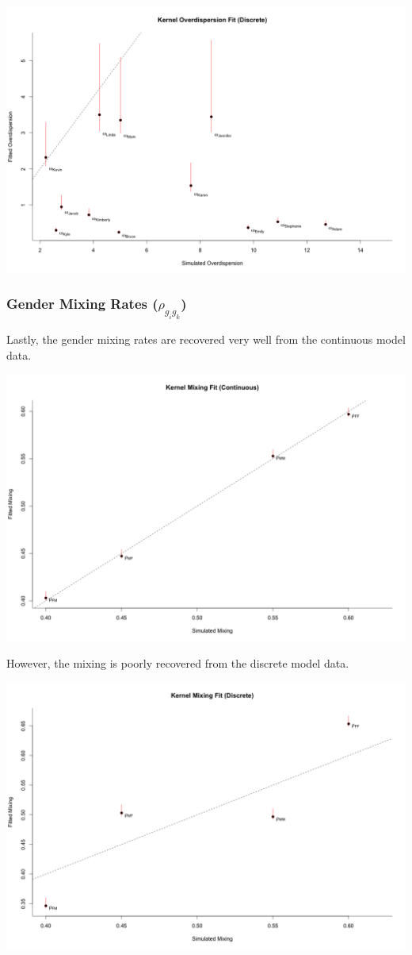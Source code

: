 \documentclass[12pt]{article}
\begin{document}
\includegraphics[scale = 0.38]{Estimates_Omega_Discrete.png}

\pagebreak
\subsubsection*{Gender Mixing Rates ($\rho_{g_ig_k}$)}
\noindent Lastly, the gender mixing rates are recovered very well from the continuous model data.

\includegraphics[scale = 0.38]{Estimates_Mixing_Continuous.png}

\noindent However, the mixing is poorly recovered from the discrete model data.

\includegraphics[scale = 0.38]{Estimates_Mixing_Discrete.png}
\end{document}
